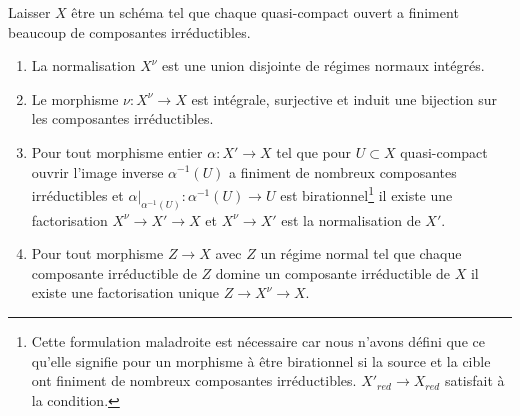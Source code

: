 \begin{lemma}

\label{lemma-normalization-normal}

Laisser $X$ être un schéma tel que chaque quasi-compact ouvert a finiment beaucoup de composantes irréductibles.

\begin{enumerate}

\item La normalisation $X^\nu$ est une union disjointe de régimes normaux intégrés.
\item Le morphisme $\nu : X^\nu \to X$ est intégrale, surjective et induit une bijection sur les composantes irréductibles.
\item Pour tout morphisme entier $\alpha : X' \to X$ tel que pour
$U \subset X$ quasi-compact ouvrir l'image inverse $\alpha^{-1}(U)$ a finiment de nombreux composantes irréductibles et
$\alpha|_{\alpha^{-1}(U)} : \alpha^{-1}(U) \to U$ est birationnel\footnote{Cette formulation maladroite est nécessaire car nous n'avons défini que ce qu'elle signifie pour un morphisme à être birationnel si la source et la cible ont finiment de nombreux composantes irréductibles.
$X'_{red} \to X_{red}$ satisfait à la condition.} il existe une factorisation
$X^\nu \to X' \to X$ et $X^\nu \to X'$ est la normalisation de $X'$.
\item Pour tout morphisme $Z \to X$ avec $Z$ un régime normal tel que chaque composante irréductible de $Z$ domine un composante irréductible de $X$ il existe une factorisation unique $Z \to X^\nu \to X$.

\end{enumerate}

\end{lemma}

